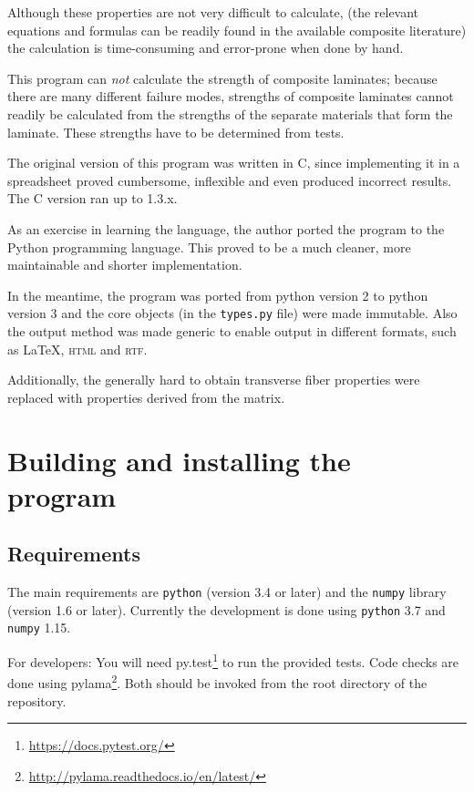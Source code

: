 \documentclass[a4paper,landscape,oneside,11pt,twocolumn]{memoir}
\begin{document}
Although these properties are not very difficult to calculate, (the relevant
equations and formulas can be readily found in the available composite
literature) the calculation is time-consuming and error-prone when done by
hand.

This program can \emph{not} calculate the strength of composite laminates;
because there are many different failure modes, strengths of composite
laminates cannot readily be calculated from the strengths of the separate
materials that form the laminate. These strengths have to be determined from
tests.

The original version of this program was written in C, since implementing
it in a spreadsheet proved cumbersome, inflexible and even produced
incorrect results. The C version ran up to 1.3.x.

As an exercise in learning the language, the author ported the program to
the Python programming language. This proved to be a much cleaner, more
maintainable and shorter implementation.

In the meantime, the program was ported from python version 2 to python
version 3 and the core objects (in the \texttt{types.py} file) were made
immutable. Also the output method was made generic to enable output in
different formats, such as \LaTeX, \textsc{html} and \textsc{rtf}.

Additionally, the generally hard to obtain transverse fiber properties
were replaced with properties derived from the matrix.

\chapter{Building and installing the program} %

\section{Requirements} %

The main requirements are \texttt{python} (version 3.4 or later) and the
\texttt{numpy} library (version 1.6 or later). Currently the development is
done using \texttt{python} 3.7 and \texttt{numpy} 1.15.

For developers: You will need py.test\footnote{\url{https://docs.pytest.org/}}
to run the provided tests. Code checks are done using
pylama\footnote{\url{http://pylama.readthedocs.io/en/latest/}}. Both should be
invoked from the root directory of the repository.
\end{document}
